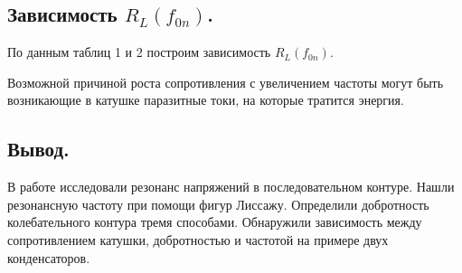 \documentclass[12pt,a4paper]{article}
\begin{document}
    \subsection{Зависимость $R_L(f_{0n})$.}
        По данным таблиц 1 и 2 построим зависимость $R_L(f_{0n})$.
        \begin{center}
        \end{center}
        
    Возможной причиной роста сопротивления с увеличением частоты могут быть возникающие в катушке паразитные токи, на которые тратится энергия.
    
    \subsection{Вывод.}
        В работе исследовали резонанс напряжений в последовательном контуре. Нашли резонансную частоту при помощи фигур Лиссажу. Определили добротность колебательного контура тремя способами. Обнаружили зависимость между сопротивлением катушки, добротностью и частотой на примере двух конденсаторов.
\end{document}

